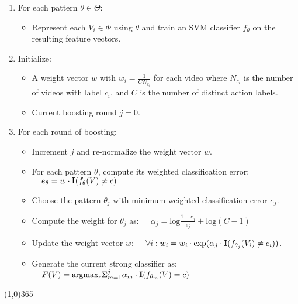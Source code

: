       \begin{enumerate}
        \item For each pattern $\theta \in \Theta$:
          \begin{itemize}
            \item Represent each $V_i \in \Phi$ using $\theta$
            and train an SVM classifier $f_\theta$ on the
            resulting feature vectors.
          \end{itemize}

        \item Initialize:
          \begin{itemize}
            \item A weight vector $w$ with $w_i = \frac{1}{C N_{c_i}}$ for each video
              where
              $N_{c_i}$ is the number of videos with label $c_i$, and
              $C$ is the number of distinct action labels.
            \item Current boosting round $j=0$.
          \end{itemize}

        \item For each round of boosting:
          \begin{itemize}
            \item Increment $j$ and re-normalize the weight vector $w$.
            \item For each pattern $\theta$,
              compute its weighted classification error:
              $\;\;\;\;e_\theta = w \cdot \mbox{\textbf{I}}(f_\theta(V) \neq c)$
            \item Choose the pattern $\theta_j$ with minimum weighted
              classification error $e_j$.
            \item Compute the weight for $\theta_j$ as:
              $\;\;\;\;\alpha_j = \mbox{log} \frac{1 - e_j}{e_j} + \mbox{log}(C-1)$
            \item Update the weight vector $w$:
              $\;\;\;\;\forall i: w_i = w_i \cdot \mbox{exp}(\alpha_j \cdot
              \mbox{\textbf{I}}(f_{\theta_j}(V_i) \neq c_i))$.
            \item Generate the current strong classifier as:
              $\;\;\;\;F(V) = \mbox{argmax}_c \Sigma_{m=1}^j \alpha_m \cdot
              \mbox{\textbf{I}}(f_{\theta_m}(V) = c)$
          \end{itemize}
      \end{enumerate}
  \line(1,0){365}\\
  \normalsize
